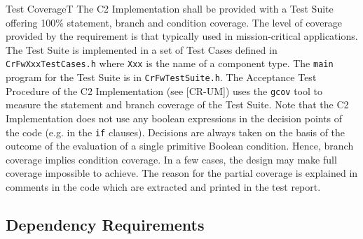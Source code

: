 \documentclass{pnp_article}
\begin{document}
\begin{fwReq}{Test Coverage}{T}
{The C2 Implementation shall be provided with a Test Suite offering 100\% statement, branch and condition coverage.}
{The level of coverage provided by the requirement is that typically used in mission-critical applications.}
{The Test Suite is implemented in a set of Test Cases defined in \texttt{CrFwXxxTestCases.h} where \texttt{Xxx} is the name of a component type. The \texttt{main} program for the Test Suite is in \texttt{CrFwTestSuite.h}.} 
{The Acceptance Test Procedure of the C2 Implementation (see [CR-UM]) uses the \texttt{gcov} tool to measure the statement and branch coverage of the Test Suite. Note that the C2 Implementation does not use any boolean expressions in the decision 
points of the code (e.g. in the \texttt{if} clauses). Decisions are always taken on the basis of the outcome of the evaluation of a single primitive Boolean condition. Hence, branch coverage implies condition coverage. In a few cases, the design may make full coverage impossible to achieve. The reason for the partial coverage is explained in comments in the code which are extracted and printed in the test report.}
\end{fwReq}





\subsection{Dependency Requirements}\label{req:dependencyReqs}
\end{document}
